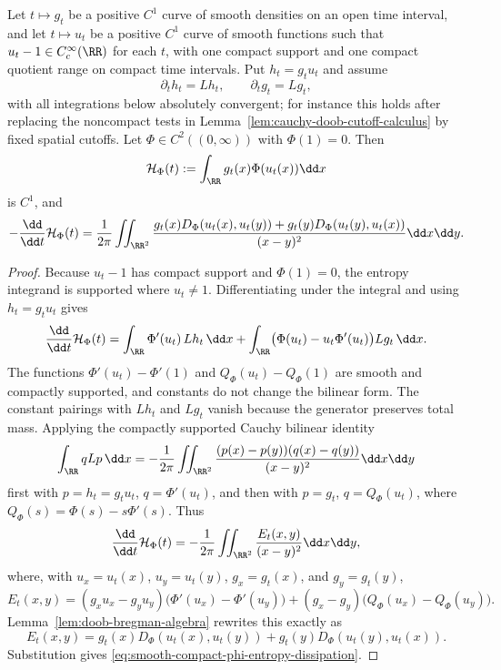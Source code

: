 \begin{proposition}%
\label{prop:smooth-compact-doob-bregman}
Let $t\mapsto g_t$ be a positive $C^1$ curve of smooth densities on an open
time interval, and let $t\mapsto u_t$ be a positive $C^1$ curve of smooth
functions such that $u_t-1\in C_c^\infty(\RR)$ for each $t$, with one compact
support and one compact quotient range on compact time intervals.  Put
$h_t=g_tu_t$ and assume
\[
\partial_t h_t=Lh_t,\qquad \partial_tg_t=Lg_t,
\]
with all integrations below absolutely convergent; for instance this holds
after replacing the noncompact tests in Lemma~\ref{lem:cauchy-doob-cutoff-calculus}
by fixed spatial cutoffs.  Let $\Phi\in C^2((0,\infty))$ with $\Phi(1)=0$.
Then
\[
\mathcal H_\Phi(t):=\int_{\RR}g_t(x)\Phi(u_t(x))\dd x
\]
is $C^1$, and
\begin{equation}\label{eq:smooth-compact-phi-entropy-dissipation}
-\frac{\dd}{\dd t}\mathcal H_\Phi(t)
=
\frac{1}{2\pi}\iint_{\RR^2}
\frac{
g_t(x)D_\Phi(u_t(x),u_t(y))
+g_t(y)D_\Phi(u_t(y),u_t(x))}
{(x-y)^2}\dd x\dd y .
\end{equation}
\end{proposition}

\begin{proof}
Because $u_t-1$ has compact support and $\Phi(1)=0$, the entropy integrand is
supported where $u_t\ne1$.  Differentiating under the integral and using
$h_t=g_tu_t$ gives
\[
\frac{\dd}{\dd t}\mathcal H_\Phi(t)
=
\int_{\RR}\Phi'(u_t)\,Lh_t\,\dd x
+
\int_{\RR}\bigl(\Phi(u_t)-u_t\Phi'(u_t)\bigr)Lg_t\,\dd x .
\]
The functions $\Phi'(u_t)-\Phi'(1)$ and
$Q_\Phi(u_t)-Q_\Phi(1)$ are smooth and compactly supported, and constants do
not change the bilinear form.  The constant pairings with $Lh_t$ and $Lg_t$
vanish because the generator preserves total mass.  Applying the compactly
supported Cauchy bilinear identity
\[
\int_{\RR}qLp\,\dd x
=-\frac{1}{2\pi}\iint_{\RR^2}
\frac{(p(x)-p(y))(q(x)-q(y))}{(x-y)^2}\dd x\dd y
\]
first with $p=h_t=g_tu_t$, $q=\Phi'(u_t)$, and then with
$p=g_t$, $q=Q_\Phi(u_t)$, where
$Q_\Phi(s)=\Phi(s)-s\Phi'(s)$.  Thus
\[
\frac{\dd}{\dd t}\mathcal H_\Phi(t)
=-\frac{1}{2\pi}\iint_{\RR^2}\frac{E_t(x,y)}{(x-y)^2}\dd x\dd y,
\]
where, with $u_x=u_t(x)$, $u_y=u_t(y)$, $g_x=g_t(x)$, and $g_y=g_t(y)$,
\[
E_t(x,y)
=(g_xu_x-g_yu_y)\bigl(\Phi'(u_x)-\Phi'(u_y)\bigr)
 +(g_x-g_y)\bigl(Q_\Phi(u_x)-Q_\Phi(u_y)\bigr).
\]
Lemma~\ref{lem:doob-bregman-algebra} rewrites this exactly as
\[
E_t(x,y)=g_t(x)D_\Phi(u_t(x),u_t(y))
+g_t(y)D_\Phi(u_t(y),u_t(x)).
\]
Substitution gives \eqref{eq:smooth-compact-phi-entropy-dissipation}.
\end{proof}

